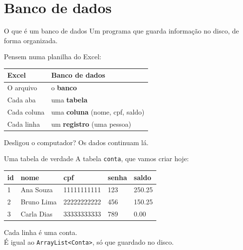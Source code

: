 \documentclass[aspectratio=169,11pt]{beamer}
\begin{document}
\section{Banco de dados}

\begin{frame}{O que é um banco de dados}
  Um programa que guarda informação no disco, de forma organizada.

  \vspace{0.5em}
  Pensem numa planilha do Excel:

  \vspace{0.4em}
  \begin{center}
  \begin{tabular}{ll}
    \toprule
    Excel & Banco de dados \\
    \midrule
    O arquivo & o \textbf{banco} \\
    Cada aba & uma \textbf{tabela} \\
    Cada coluna & uma \textbf{coluna} (nome, cpf, saldo) \\
    Cada linha & um \textbf{registro} (uma pessoa) \\
    \bottomrule
  \end{tabular}
  \end{center}

  \vspace{0.5em}
  Desligou o computador? Os dados continuam lá.
\end{frame}

\begin{frame}{Uma tabela de verdade}
  A tabela \texttt{conta}, que vamos criar hoje:

  \vspace{0.5em}
  \begin{center}
  \begin{tabular}{lllll}
    \toprule
    id & nome & cpf & senha & saldo \\
    \midrule
    1 & Ana Souza & 11111111111 & 123 & 250.25 \\
    2 & Bruno Lima & 22222222222 & 456 & 150.25 \\
    3 & Carla Dias & 33333333333 & 789 & 0.00 \\
    \bottomrule
  \end{tabular}
  \end{center}

  \vspace{0.5em}
  Cada linha é uma conta.\\
  É igual ao \texttt{ArrayList<Conta>}, só que guardado no disco.
\end{frame}
\end{document}
